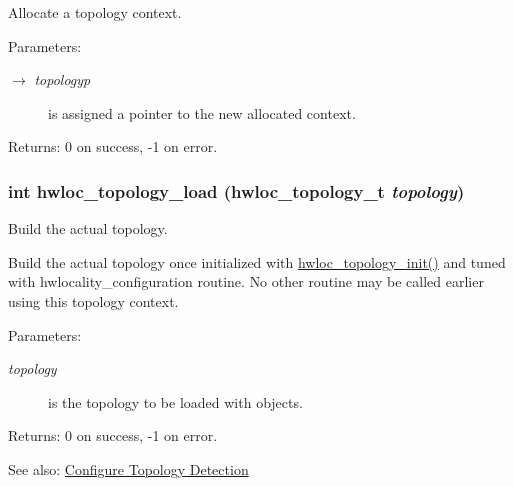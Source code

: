 Allocate a topology context. 

\begin{Desc}
\item[Parameters:]
\begin{description}
\item[\mbox{$\rightarrow$} {\em topologyp}]is assigned a pointer to the new allocated context.\end{description}
\end{Desc}
\begin{Desc}
\item[Returns:]0 on success, -1 on error. \end{Desc}
\hypertarget{group__hwlocality__creation_gbdf58d87ad77f6615fccdfe0535ff826}{
\subsubsection[{hwloc\_\-topology\_\-load}]{\setlength{\rightskip}{0pt plus 5cm}int hwloc\_\-topology\_\-load ({\bf hwloc\_\-topology\_\-t} {\em topology})}}
\label{group__hwlocality__creation_gbdf58d87ad77f6615fccdfe0535ff826}


Build the actual topology. 

Build the actual topology once initialized with \hyperlink{group__hwlocality__creation_g03fd4a16d8b9ee1ffc32b25fd2f6bdfa}{hwloc\_\-topology\_\-init()} and tuned with hwlocality\_\-configuration routine. No other routine may be called earlier using this topology context.

\begin{Desc}
\item[Parameters:]
\begin{description}
\item[{\em topology}]is the topology to be loaded with objects.\end{description}
\end{Desc}
\begin{Desc}
\item[Returns:]0 on success, -1 on error.\end{Desc}
\begin{Desc}
\item[See also:]\hyperlink{group__hwlocality__configuration}{Configure Topology Detection} \end{Desc}
